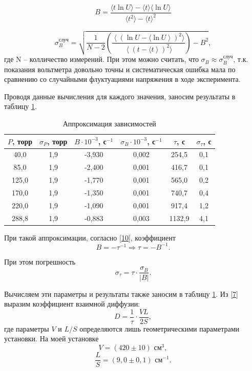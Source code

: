 \documentclass[a4paper,12pt]{article} %
\begin{document}
\begin{equation}\label{mnk:B}
B=\frac{\langle t\ln U \rangle - \langle t\rangle \langle \ln U\rangle}{\langle t^2 \rangle - \langle t \rangle^2}
\end{equation}

\begin{equation}\label{mnk:sigmaB}
\sigma^\text{случ}_B = \sqrt{\frac{1}{N-2} \left(\frac{\left\langle\left(\ln U - \langle \ln U\right\rangle\right)^2 \rangle}{\left\langle\left(t - \langle t\right\rangle\right)^2 \rangle}\right)-B^2},
\end{equation}
где N -- колличество измерений. При этом можно считать, что $ \sigma_B \approx \sigma_B^\text{случ} $, т.к. показания вольтметра довольно точны и систематическая ошибка мала по сравнению со случайными флуктуациями напряжения в ходе эксперимента.

Проводя данные вычисления для каждого значения, заносим результаты в таблицу \ref{tab:approx}.

\begin{table}[H]
	\centering
	\begin{tabular}{|c|c|c|c|c|c|}
		\hline
		$ P $, торр & $ \sigma_P $, торр & $ B \cdot 10^{-3} $, с$ ^{-1} $ & $ \sigma_{B} \cdot 10^{-3} $, с$ ^{-1} $ & $ \tau $, с & $ \sigma_\tau $, с \\ \hline
		40,0 & 1,9 & -3,930 & 0,002 & 254,5 & 0,1 \\ \hline
		85,0 & 1,9 & -2,400 & 0,001 & 416,7 & 0,1 \\ \hline
		125,0 & 1,9 & -1,770 & 0,001 & 565,0 & 0,2 \\ \hline
		170,0 & 1,9 & -1,350 & 0,001 & 740,7 & 0,4 \\ \hline
		220,0 & 1,9 & -1,090 & 0,001 & 917,4 & 1,2 \\ \hline
		288,8 & 1,9 & -0,883 & 0,003 & 1132,9 & 4,1 \\ \hline
	\end{tabular}
	\caption{Аппроксимация зависимостей}
	\label{tab:approx}
\end{table}

При такой аппроксимации, согласно \eqref{10}, коэффициент 
\[ B = -\tau^{-1} \Rightarrow \tau = -B^{-1}. \]

При этом погрешность
\[ \sigma_\tau = \tau \cdot \frac{\sigma_{B}}{|B|}. \]

Вычисляем эти параметры и результаты также заносим в таблицу \ref{tab:approx}. Из \eqref{7} выразим коэффициент взаимной диффузии: \begin{equation}\label{D}
 D = \frac{1}{\tau}\cdot\frac{VL}{2S},
\end{equation} где параметры $ V $ и $ L/S $ определяются лишь геометрическими параметрами установки. На моей установке \[ V = (420\pm 10) \text{ см}^3,\] \[ \frac{L}{S} = (9,0 \pm 0,1) \text{ см}^{-1}. \]
\end{document}
